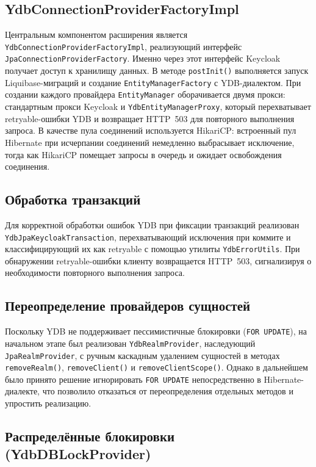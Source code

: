 \documentclass[times]{itmo-student-thesis}
\begin{document}
\subsection{YdbConnectionProviderFactoryImpl}

Центральным компонентом расширения является \texttt{Ydb\-Connection\-Provider\-Factory\-Impl},
реализующий интерфейс \texttt{JpaConnectionProviderFactory}.
Именно через этот интерфейс Keycloak получает доступ к хранилищу данных.
В методе \texttt{postInit()} выполняется запуск Liquibase-миграций и создание
\texttt{EntityManagerFactory} с YDB-диалектом.
При создании каждого провайдера \texttt{EntityManager} оборачивается двумя прокси:
стандартным прокси Keycloak и \texttt{YdbEntityManagerProxy}, который перехватывает
retryable-ошибки YDB и возвращает HTTP~503 для повторного выполнения запроса.
В качестве пула соединений используется HikariCP: встроенный пул Hibernate
при исчерпании соединений немедленно выбрасывает исключение, тогда как HikariCP
помещает запросы в очередь и ожидает освобождения соединения.

\subsection{Обработка транзакций}

Для корректной обработки ошибок YDB при фиксации транзакций реализован
\texttt{YdbJpaKeycloakTransaction}, перехватывающий исключения при коммите
и классифицирующий их как retryable с помощью утилиты \texttt{YdbErrorUtils}.
При обнаружении retryable-ошибки клиенту возвращается HTTP~503,
сигнализируя о необходимости повторного выполнения запроса.

\subsection{Переопределение провайдеров сущностей}

Поскольку YDB не поддерживает пессимистичные блокировки (\texttt{FOR UPDATE}),
на начальном этапе был реализован \texttt{YdbRealmProvider}, наследующий
\texttt{JpaRealmProvider}, с ручным каскадным удалением сущностей в методах
\texttt{removeRealm()}, \texttt{removeClient()} и \texttt{removeClientScope()}.
Однако в дальнейшем было принято решение игнорировать \texttt{FOR UPDATE}
непосредственно в Hibernate-диалекте, что позволило отказаться от переопределения
отдельных методов и упростить реализацию.

\subsection{Распределённые блокировки (YdbDBLockProvider)}
\end{document}
